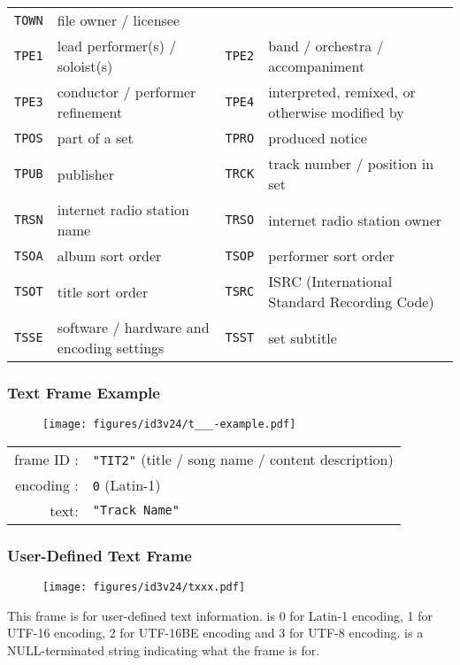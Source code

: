 \begin{table}[h]
{\begin{tabular}{|c|l||c|l|}
      \texttt{TOWN} & file owner / licensee \\
      \texttt{TPE1} & lead performer(s) / soloist(s) &
      \texttt{TPE2} & band / orchestra / accompaniment \\
      \texttt{TPE3} & conductor / performer refinement &
      \texttt{TPE4} & interpreted, remixed, or otherwise modified by \\
      \texttt{TPOS} & part of a set &
      \texttt{TPRO} & produced notice \\
      \texttt{TPUB} & publisher &
      \texttt{TRCK} & track number / position in set \\
      \texttt{TRSN} & internet radio station name &
      \texttt{TRSO} & internet radio station owner \\
      \texttt{TSOA} & album sort order &
      \texttt{TSOP} & performer sort order \\
      \texttt{TSOT} & title sort order &
      \texttt{TSRC} & ISRC (International Standard Recording Code) \\
      \texttt{TSSE} & software / hardware and encoding settings &
      \texttt{TSST} & set subtitle \\
      \hline
    \end{tabular}
  }
\end{table}

\clearpage

\subsubsection{Text Frame Example}
\begin{figure}[h]
  \texttt{[image: figures/id3v24/t\_\_\_-example.pdf]}
\end{figure}
\begin{table}[h]
\begin{tabular}{rl}
frame ID : & \texttt{"TIT2"} (title / song name / content description) \\
encoding : & \texttt{0} (Latin-1) \\
text: & \texttt{"Track Name"} \\
\end{tabular}
\end{table}

\subsubsection{User-Defined Text Frame}
\begin{figure}[h]
  \texttt{[image: figures/id3v24/txxx.pdf]}
\end{figure}
\par
\noindent
This frame is for user-defined text information.
 is 0 for Latin-1 encoding, 1 for UTF-16 encoding,
2 for UTF-16BE encoding and 3 for UTF-8 encoding.
 is a NULL-terminated string indicating
what the frame is for.


